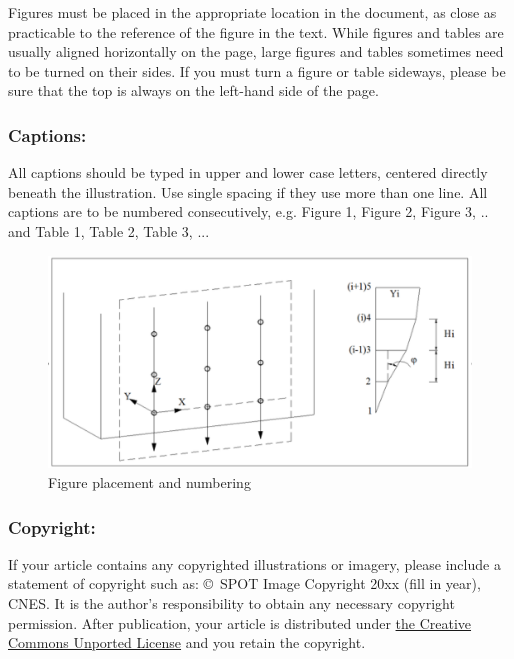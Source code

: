 \documentclass{isprs} %
\begin{document}
Figures must be placed in the appropriate location in the document, 
as close as practicable to the reference of the figure in the text. 
While figures and tables are usually aligned horizontally on the page, 
large figures and tables sometimes need to be turned on their sides. 
If you must turn a figure or table sideways, please be sure that the 
top is always on the left-hand side of the page.


\subsubsection{Captions:}\label{sec:Captions}

All captions should be typed in upper and lower case letters, 
centered directly beneath the illustration. Use single spacing if they 
use more than one line. All captions are to be numbered consecutively, 
e.g. Figure 1, Figure 2, Figure 3, ..  and Table 1, Table 2, Table 3, ...

\begin{figure}[ht!]
\begin{center}
		\includegraphics[width=1.0\columnwidth]{figures/test_sites/fig1.eps}
	\caption{Figure placement and numbering}
\label{fig:figure_placement}
\end{center}
\end{figure}


\subsubsection{Copyright:}\label{sec:Copyright}

If your article contains any copyrighted illustrations or imagery, 
please include a statement of copyright such as: \copyright~SPOT Image Copyright 20xx 
(fill in year), CNES\@. It is the author's responsibility to obtain any necessary 
copyright permission. After publication, your article is distributed under \underline{the Creative 
Commons Unported License} and you retain the copyright.
\end{document}
